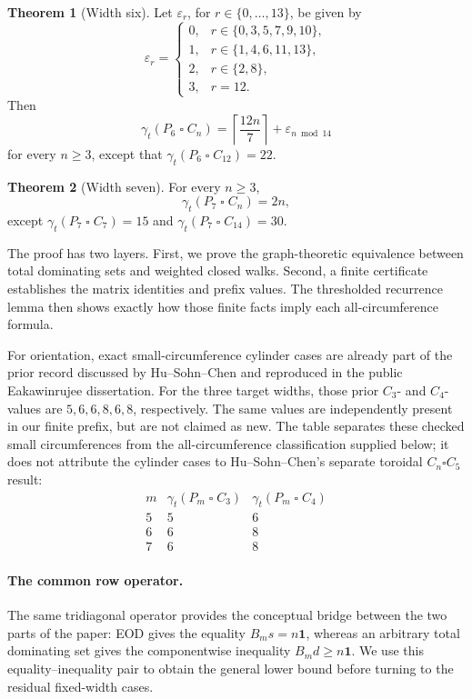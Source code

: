 \documentclass[11pt]{article}
\theoremstyle{definition}
\newtheorem{theorem}{Theorem}[section]
\newcommand{\gt}{\gamma_t}
\newcommand{\sq}{\mathbin{\square}}
\begin{document}
\begin{theorem}[Width six]\label{thm:w6}
Let \(\varepsilon_r\), for \(r\in\{0,\ldots,13\}\), be given by
\[
\varepsilon_r=\begin{cases}
0,&r\in\{0,3,5,7,9,10\},\\
1,&r\in\{1,4,6,11,13\},\\
2,&r\in\{2,8\},\\
3,&r=12.
\end{cases}
\]
Then
\[
\gt(P_6\sq C_n)=\left\lceil\frac{12n}{7}\right\rceil
+\varepsilon_{n\bmod14}
\]
for every \(n\geq3\), except that \(\gt(P_6\sq C_{12})=22\).
\end{theorem}

\begin{theorem}[Width seven]\label{thm:w7}
For every \(n\geq3\),
\[
\gt(P_7\sq C_n)=2n,
\]
except \(\gt(P_7\sq C_7)=15\) and \(\gt(P_7\sq C_{14})=30\).
\end{theorem}

The proof has two layers. First, we prove the graph-theoretic equivalence
between total dominating sets and weighted closed walks. Second, a finite
certificate establishes the matrix identities and prefix values. The
thresholded recurrence lemma then shows exactly how those finite facts imply
each all-circumference formula.

For orientation, exact small-circumference cylinder cases are already part of
the prior record discussed by Hu--Sohn--Chen and reproduced in the public
Eakawinrujee dissertation. For the three target widths, those prior
\(C_3\)- and \(C_4\)-values are \(5,6,6,8,6,8\), respectively. The same
values are independently present in our finite prefix, but are not claimed
as new. The table separates these checked small circumferences from the
all-circumference classification supplied below; it does not attribute the
cylinder cases to Hu--Sohn--Chen's separate toroidal \(C_n\square C_5\)
result:
\[
\begin{array}{c|cc}
 m & \gt(P_m\sq C_3) & \gt(P_m\sq C_4)\\ \hline
 5&5&6\\ 6&6&8\\ 7&6&8
\end{array}
\]

\paragraph{The common row operator.}
The same tridiagonal operator provides the conceptual bridge between the two
parts of the paper: EOD gives the equality \(B_ms=n\mathbf1\), whereas an
arbitrary total dominating set gives the componentwise inequality
\(B_md\ge n\mathbf1\). We use this equality--inequality pair to obtain the
general lower bound before turning to the residual fixed-width cases.
\end{document}
